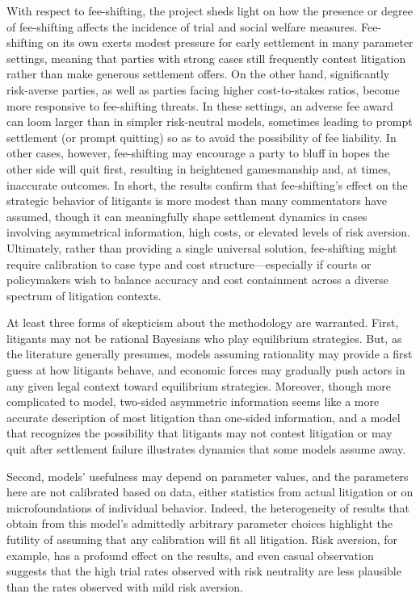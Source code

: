 \documentclass{article}
\begin{document}
With respect to fee-shifting, the project sheds light on how the presence or degree of fee-shifting affects the incidence of trial and social welfare measures. Fee-shifting on its own exerts modest pressure for early settlement in many parameter settings, meaning that parties with strong cases still frequently contest litigation rather than make generous settlement offers. On the other hand, significantly risk-averse parties, as well as parties facing higher cost-to-stakes ratios, become more responsive to fee-shifting threats. In these settings, an adverse fee award can loom larger than in simpler risk-neutral models, sometimes leading to prompt settlement (or prompt quitting) so as to avoid the possibility of fee liability. In other cases, however, fee-shifting may encourage a party to bluff in hopes the other side will quit first, resulting in heightened gamesmanship and, at times, inaccurate outcomes. In short, the results confirm that fee-shifting’s effect on the strategic behavior of litigants is more modest than many commentators have assumed, though it can meaningfully shape settlement dynamics in cases involving asymmetrical information, high costs, or elevated levels of risk aversion. Ultimately, rather than providing a single universal solution, fee-shifting might require calibration to case type and cost structure—especially if courts or policymakers wish to balance accuracy and cost containment across a diverse spectrum of litigation contexts. 

At least three forms of skepticism about the methodology are warranted. First, litigants may not be rational Bayesians who play equilibrium strategies. But, as the literature generally presumes, models assuming rationality may provide a first guess at how litigants behave, and economic forces may gradually push actors in any given legal context toward equilibrium strategies.  Moreover, though more complicated to model, two-sided asymmetric information seems like a more accurate description of most litigation than one-sided information, and a model that recognizes the possibility that litigants may not contest litigation or may quit after settlement failure illustrates dynamics that some models assume away. 

Second, models' usefulness may depend on parameter values, and the parameters here are not calibrated based on data, either statistics from actual litigation or on microfoundations of individual behavior. Indeed, the heterogeneity of results that obtain from this model's admittedly arbitrary parameter choices highlight the futility of assuming that any calibration will fit all litigation. Risk aversion, for example, has a profound effect on the results, and even casual observation suggests that the high trial rates observed with risk neutrality are less plausible than the rates observed with mild risk aversion. 
\end{document}
